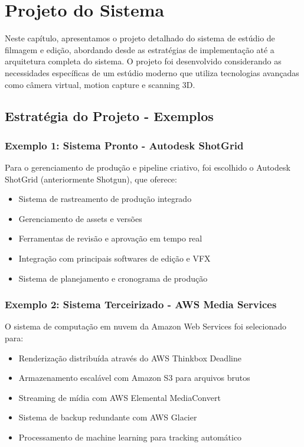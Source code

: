 
\chapter{Projeto do Sistema}

Neste capítulo, apresentamos o projeto detalhado do sistema de estúdio de filmagem e edição, abordando desde as estratégias de implementação até a arquitetura completa do sistema. O projeto foi desenvolvido considerando as necessidades específicas de um estúdio moderno que utiliza tecnologias avançadas como câmera virtual, motion capture e scanning 3D.

\section{Estratégia do Projeto - Exemplos}

\subsection{Exemplo 1: Sistema Pronto - Autodesk ShotGrid}
Para o gerenciamento de produção e pipeline criativo, foi escolhido o Autodesk ShotGrid (anteriormente Shotgun), que oferece:
\begin{itemize}
    \item Sistema de rastreamento de produção integrado
    \item Gerenciamento de assets e versões
    \item Ferramentas de revisão e aprovação em tempo real
    \item Integração com principais softwares de edição e VFX
    \item Sistema de planejamento e cronograma de produção
\end{itemize}

\subsection{Exemplo 2: Sistema Terceirizado - AWS Media Services}
O sistema de computação em nuvem da Amazon Web Services foi selecionado para:
\begin{itemize}
    \item Renderização distribuída através do AWS Thinkbox Deadline
    \item Armazenamento escalável com Amazon S3 para arquivos brutos
    \item Streaming de mídia com AWS Elemental MediaConvert
    \item Sistema de backup redundante com AWS Glacier
    \item Processamento de machine learning para tracking automático
\end{itemize}

